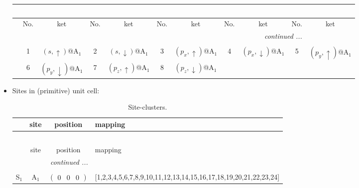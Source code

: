 \documentclass[fleqn,10pt,landscape]{article}
\begin{document}
\begin{itemize}
\begin{center}
\begin{longtable}{c|cc|cc|cc|cc|cc}
\multicolumn{10}{l}{\tablename\ \thetable{}} \\
 \hline \hline
 & No. & ket & No. & ket & No. & ket & No. & ket & No. & ket \\ \hline \endhead

 \hline \hline
\multicolumn{10}{r}{\footnotesize\it continued ...} \\ \endfoot

 \hline \hline
\multicolumn{10}{r}{} \\ \endlastfoot

 & 1 & $(s,\uparrow)$@A$_{1}$ & 2 & $(s,\downarrow)$@A$_{1}$ & 3 & $(p_{x},\uparrow)$@A$_{1}$ & 4 & $(p_{x},\downarrow)$@A$_{1}$ & 5 & $(p_{y},\uparrow)$@A$_{1}$ \\
& 6 & $(p_{y},\downarrow)$@A$_{1}$ & 7 & $(p_{z},\uparrow)$@A$_{1}$ & 8 & $(p_{z},\downarrow)$@A$_{1}$ &  &  &  &  \\
\end{longtable}
\end{center}

\item Sites in (primitive) unit cell:
\begin{center}
\renewcommand{\arraystretch}{1.3}
\begin{longtable}{cc|c|l}
\caption{Site-clusters.}
 \\
 \hline \hline
 & site & position & mapping \\ \hline \endfirsthead

\multicolumn{3}{l}{\tablename\ \thetable{}} \\
 \hline \hline
 & site & position & mapping \\ \hline \endhead

 \hline \hline
\multicolumn{3}{r}{\footnotesize\it continued ...} \\ \endfoot

 \hline \hline
\multicolumn{3}{r}{} \\ \endlastfoot

S$_{1}$ & A$_1$ & $\begin{pmatrix} 0 & 0 & 0 \end{pmatrix}$ & [1,2,3,4,5,6,7,8,9,10,11,12,13,14,15,16,17,18,19,20,21,22,23,24] \\
\end{longtable}
\end{center}


\end{itemize}
\end{document}
